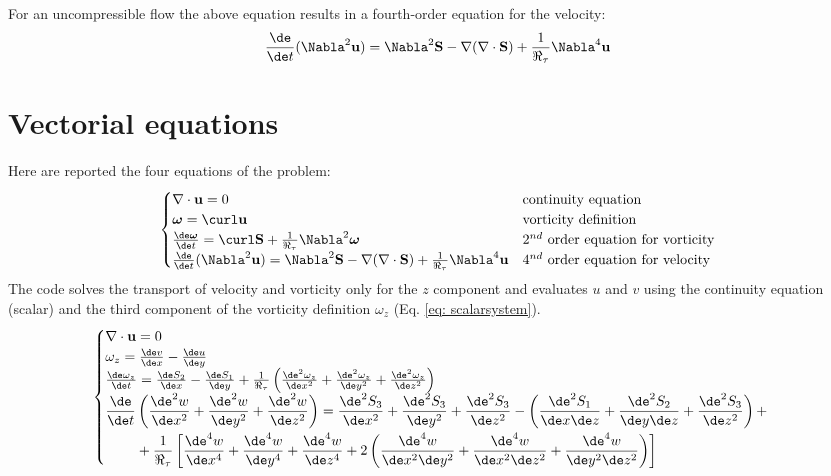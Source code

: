 \renewcommand\arraystretch{1}
For an uncompressible flow the above equation results in a fourth-order equation for the velocity:
\begin{equation}
\frac{\de}{\de t}(\Nabla^2 \mathbf u)=\Nabla^2 \mathbf S -\nabla(\nabla\cdot\mathbf S)+\frac{1}{\Re_\tau}\Nabla^4 \mathbf u
\end{equation}


\section{Vectorial equations}
Here are reported the four equations of the problem:
\begin{equation}
\begin{cases}
\nabla\cdot\mathbf u=0 &\textnormal{continuity equation}\\
\boldsymbol\omega=\curl\mathbf u&\textnormal{vorticity definition}\\
\frac{\de \boldsymbol \omega}{\de t}=\curl\mathbf S+\frac{1}{\Re_\tau}\Nabla^2\boldsymbol \omega&\textnormal{2$^{nd}$ order equation for vorticity}\\
\frac{\de}{\de t}(\Nabla^2 \mathbf u)=\Nabla^2 \mathbf S -\nabla(\nabla\cdot\mathbf S)+\frac{1}{\Re_\tau}\Nabla^4 \mathbf u&\textnormal{4$^{nd}$ order equation for velocity}\\
\end{cases}
\end{equation}
The code solves the transport of velocity and vorticity only for the $z$ component and evaluates $u$ and $v$ using the continuity equation (scalar) and the third component of the vorticity definition $\omega_z$ (Eq. \ref{eq: scalarsystem}).
\begin{equation}
\begin{cases}
\nabla\cdot\mathbf u=0 \\
\omega_z=\frac{\de v}{\de x}-\frac{\de u}{\de y}\\
\frac{\de \omega_z}{\de t}= \frac{\de S_2}{\de x}-\frac{\de S_1}{\de y}+\frac{1}{\Re_\tau}\left(\frac{\de^2 \omega_z}{\de x^2}+\frac{\de^2\omega_z}{\de y^2}+\frac{\de^2\omega_z}{\de z^2} \right) \\
\begin{split}
\frac{\de}{\de t}&\left( \frac{\de^2w}{\de x^2}+\frac{\de^2w}{\de y^2}+\frac{\de^2w}{\de z^2}  \right)=\frac{\de^2S_3}{\de x^2}+\frac{\de^2S_3}{\de y^2}+\frac{\de^2S_3}{\de z^2}-\left( \frac{\de^2 S_1 }{\de x \de z}+\frac{\de^2 S_2 }{\de y \de z} +\frac{\de^2 S_3 }{\de z^2} \right) +\\
&+\frac{1}{\Re_\tau}\left[ \frac{\de^4 w}{\de x^4}+\frac{\de^4 w}{\de y^4}+\frac{\de^4 w}{\de z^4}+2\left( \frac{\de^4 w}{\de x^2\de y^2} + \frac{\de^4 w}{\de x^2\de z^2} +\frac{\de^4 w}{\de y^2\de z^2}\right) \right]  \\
\end{split}
\end{cases}
\label{eq: scalarsystem}
\end{equation}


